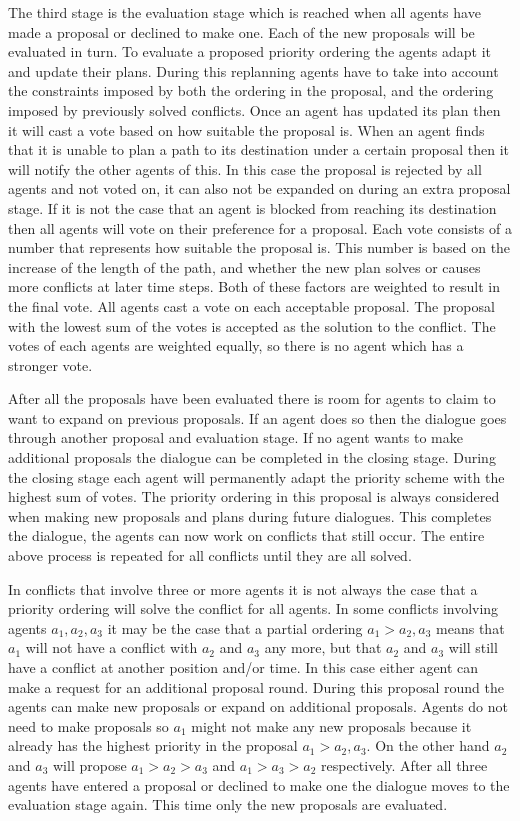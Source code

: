 The third stage is the evaluation stage which is reached when all agents have
made a proposal or declined to make one. Each of the new proposals will be
evaluated in turn. To evaluate a proposed priority ordering the agents adapt it
and update their plans. During this replanning agents have to take into account
the constraints imposed by both the ordering in the proposal, and the ordering
imposed by previously solved conflicts. Once an agent has updated its plan then
it will cast a vote based on how suitable the proposal is. When an agent finds
that it is unable to plan a path to its destination under a certain proposal
then it will notify the other agents of this. In this case the proposal is
rejected by all agents and not voted on, it can also not be expanded on during
an extra proposal stage. If it is not the case that an agent is blocked from
reaching its destination then all agents will vote on their preference for a
proposal. Each vote consists of a number that represents how
suitable the proposal is. This number is based on the increase of the length of
the path, and whether the new plan solves or causes more conflicts at later
time steps. Both of these factors are weighted to result in the final vote. All
agents cast a vote on each acceptable proposal. The proposal with the lowest
sum of the votes is accepted as the solution to the conflict. The votes of each
agents are weighted equally, so there is no agent which has a stronger vote.

After all the proposals have been evaluated there is room for agents to claim
to want to expand on previous proposals. If an agent does so then the dialogue
goes through another proposal and evaluation stage. If no agent wants to make
additional proposals the dialogue can be completed in the closing stage. During
the closing stage each agent will permanently adapt the priority scheme with
the highest sum of votes. The priority ordering in this proposal is always
considered when making new proposals and plans during future dialogues. This
completes the dialogue, the agents can now work on conflicts that still occur.
The entire above process is repeated for all conflicts until they are all
solved.

In conflicts that involve three or more agents it is not always the case that a
priority ordering will solve the conflict for all agents. In some conflicts
involving agents $a_1, a_2, a_3$ it may be the case that a partial ordering
$a_1 > a_2, a_3$ means that $a_1$ will not have a conflict with $a_2$ and $a_3$
any more, but that $a_2$ and $a_3$ will still have a conflict at another
position and/or time. In this case either agent can make a request for an
additional proposal round. During this proposal round the agents can make new
proposals or expand on additional proposals. Agents do not need to make
proposals so $a_1$ might not make any new proposals because it already has the
highest priority in the proposal $a_1 > a_2, a_3$. On the other hand $a_2$ and
$a_3$ will propose $a_1 > a_2 > a_3$ and $a_1 > a_3 > a_2$ respectively. After 
all three agents have entered a
proposal or declined to make one the dialogue moves to the evaluation stage
again. This time only the new proposals are evaluated.


